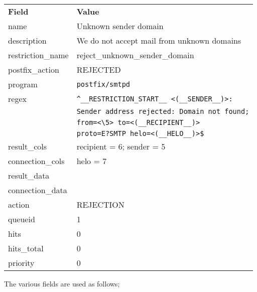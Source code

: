 \documentclass[a4paper,12pt,draft]{article}
\newcommand{\daemon}[1]{%
    \texttt{postfix/#1}%
}
\begin{document}
\begin{tabular}[]{ll}

\textbf{Field}      & \textbf{Value}                                    \\
name                & Unknown sender domain                             \\
description         & We do not accept mail from unknown domains        \\
restriction\_name   & reject\_unknown\_sender\_domain                   \\
postfix\_action     & REJECTED                                          \\
program             & \daemon{smtpd}                                    \\
regex               & \verb!^__RESTRICTION_START__ <(__SENDER__)>: !    \\
                    & \verb!Sender address rejected: Domain not found;! \\
                    & \verb!from=<\5> to=<(__RECIPIENT__)> !            \\
                    & \verb!proto=E?SMTP helo=<(__HELO__)>$!            \\
result\_cols        & recipient = 6; sender = 5                         \\
connection\_cols    & helo = 7                                          \\
result\_data        &                                                   \\
connection\_data    &                                                   \\
action              & REJECTION                                         \\
queueid             & 1                                                 \\
hits                & 0                                                 \\
hits\_total         & 0                                                 \\
priority            & 0                                                 \\

\end{tabular}

\vspace{1em}

The various fields are used as follows;
\end{document}
